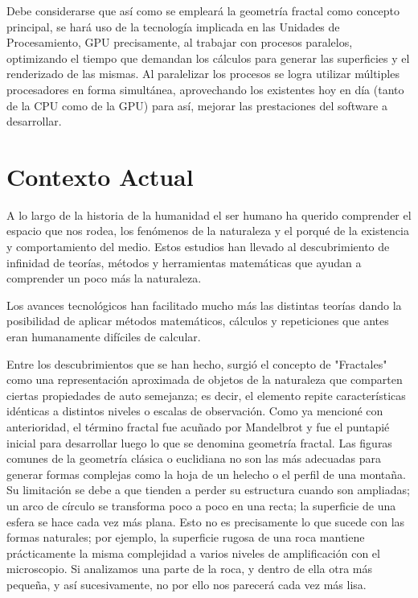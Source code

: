 \documentclass[12pt]{article} %
\begin{document}
Debe considerarse que así como se empleará la geometría fractal como concepto principal, se hará uso de la tecnología implicada en las Unidades de Procesamiento, GPU precisamente, al trabajar con procesos paralelos, optimizando el tiempo que demandan los cálculos para generar las superficies y el renderizado de las mismas. Al paralelizar los procesos se logra utilizar múltiples procesadores en forma simultánea, aprovechando los existentes hoy en día (tanto de la CPU como de la GPU)  para así, mejorar las prestaciones del software a desarrollar.



\section{Contexto Actual} %

A lo largo de la historia de la humanidad el ser humano ha querido comprender el espacio que nos rodea, los fenómenos de la naturaleza y el porqué de la existencia y comportamiento del medio. Estos estudios han llevado al descubrimiento de infinidad de teorías, métodos y herramientas matemáticas que ayudan a comprender un poco más la naturaleza.

Los avances tecnológicos han facilitado mucho más las distintas teorías dando la posibilidad de aplicar métodos matemáticos, cálculos y repeticiones que antes eran humanamente difíciles de calcular.

Entre los descubrimientos que se han hecho, surgió el concepto de "Fractales" como una representación aproximada de objetos de la naturaleza que comparten ciertas propiedades de auto semejanza; es decir, el elemento repite características idénticas a distintos niveles o escalas de observación. Como ya mencioné con anterioridad, el término fractal fue acuñado por Mandelbrot y fue el puntapié inicial para desarrollar luego lo que se denomina geometría fractal. Las figuras comunes de la geometría clásica o euclidiana no son las más adecuadas para generar formas complejas como la hoja de un helecho o el perfil de una montaña. Su limitación se debe a que tienden a perder su estructura cuando son ampliadas; un arco de círculo se transforma poco a poco en una recta; la superficie de una esfera se hace cada vez más plana. Esto no es precisamente lo que sucede con las formas naturales; por ejemplo, la superficie rugosa de una roca mantiene prácticamente la misma complejidad a varios niveles de amplificación con el microscopio. Si analizamos una parte de la roca, y dentro de ella otra más pequeña, y así sucesivamente, no por ello nos parecerá cada vez más lisa.
\end{document}
